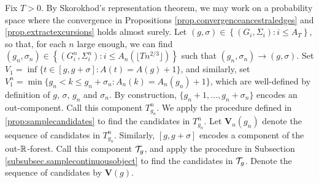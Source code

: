 Fix $T>0$. By Skorokhod's representation theorem, we may work on a probability space where the convergence in Propositions \ref{prop.convergenceancestraledges} and \ref{prop.extractexcursions} holds almost surely. Let $(g,\sigma)\in \left\{(G_i,\Sigma_i):i\leq A_T\right\}$, so that, for each $n$ large enough, we can find $(g_n,\sigma_n)\in\left\{(G_i^n,\Sigma_i^n):i\leq A_n\left(\lfloor Tn^{2/3}\rfloor\right)\right\}$ such that $(g_n,\sigma_n)\to (g,\sigma)$. Set $V_1=\inf\{t\in [g,g+\sigma]:A(t)=A(g)+1\}$, and similarly, set $V_1^n=\min\{g_n<k\leq g_n+\sigma_n:A_n(k)=A_n(g_n)+1\}$, which are well-defined by definition of $g$, $\sigma$, $g_n$ and $\sigma_n$. By construction, $\{g_n+1,\dots,g_n+\sigma_n\}$ encodes an out-component. Call this component $T^n_{g_n}$. We apply the procedure defined in \cref{prop:samplecandidates} to find the candidates in $T^n_{g_n}$. Let $\mathbf{V}_n(g_n)$ denote the sequence of candidates in $T^n_{g_n}$. Similarly, $[g,g+\sigma]$ encodes a component of the out-${\mathbb R}$-forest. Call this component ${\mathcal T}_g$, and apply the procedure in Subsection \ref{subsubsec.samplecontinuousobject} to find the candidates in ${\mathcal T}_g$. Denote the sequence of candidates by $\mathbf{V}(g)$. 

